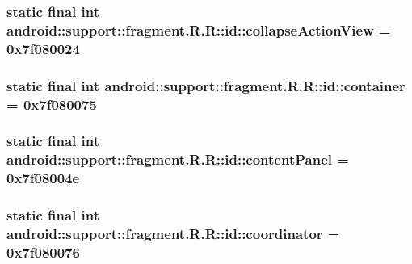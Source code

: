 \hypertarget{classandroid_1_1support_1_1fragment_1_1_r_1_1id_39271d7b8dfb5ba20379d17cc09c9576}{
\subsubsection[{collapseActionView}]{\setlength{\rightskip}{0pt plus 5cm}static final int android::support::fragment.R.R::id::collapseActionView = 0x7f080024}}
\label{classandroid_1_1support_1_1fragment_1_1_r_1_1id_39271d7b8dfb5ba20379d17cc09c9576}


\hypertarget{classandroid_1_1support_1_1fragment_1_1_r_1_1id_1a062bfb99c549ba210748336305f4bf}{
\subsubsection[{container}]{\setlength{\rightskip}{0pt plus 5cm}static final int android::support::fragment.R.R::id::container = 0x7f080075}}
\label{classandroid_1_1support_1_1fragment_1_1_r_1_1id_1a062bfb99c549ba210748336305f4bf}


\hypertarget{classandroid_1_1support_1_1fragment_1_1_r_1_1id_da52ff7a0bdf97ce290688b4824c416a}{
\subsubsection[{contentPanel}]{\setlength{\rightskip}{0pt plus 5cm}static final int android::support::fragment.R.R::id::contentPanel = 0x7f08004e}}
\label{classandroid_1_1support_1_1fragment_1_1_r_1_1id_da52ff7a0bdf97ce290688b4824c416a}


\hypertarget{classandroid_1_1support_1_1fragment_1_1_r_1_1id_8a039a641db76df2c642fa9e7ef3f9e7}{
\subsubsection[{coordinator}]{\setlength{\rightskip}{0pt plus 5cm}static final int android::support::fragment.R.R::id::coordinator = 0x7f080076}}
\label{classandroid_1_1support_1_1fragment_1_1_r_1_1id_8a039a641db76df2c642fa9e7ef3f9e7}


